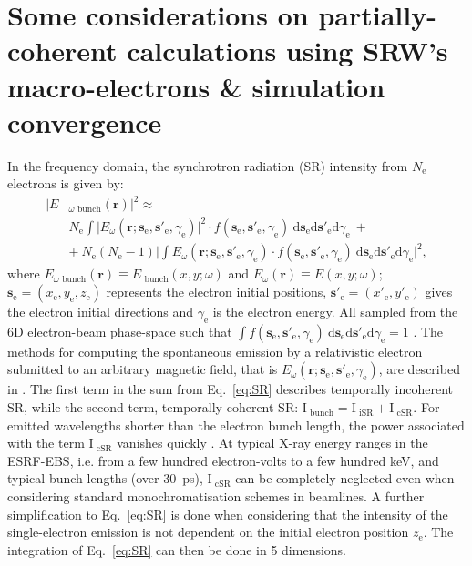\documentclass{iucr}              %
\begin{document}
\section{Some considerations on partially-coherent calculations using SRW's macro-electrons \& simulation convergence}
\label{appendix:srw}
In the frequency domain, the synchrotron radiation (SR) intensity from $N_\text{e}$ electrons is given by: 
\begin{equation}
\begin{split}
|E&_{\omega\text{~bunch}}(\textbf{r})|^2 \approx \\
 &N_\text{e} \int\big| E_\omega(\textbf{r};\textbf{s}_\text{e}, \textbf{s}'_\text{e}, \gamma_\text{e})\big|^2\cdot f(\textbf{s}_\text{e}, \textbf{s}'_\text{e}, \gamma_\text{e})~ \text{d}\textbf{s}_\text{e} \text{d}\textbf{s}'_\text{e} \text{d}\gamma_\text{e}~+\\
&+~ N_\text{e}(N_\text{e}-1)\bigg| \int E_\omega(\textbf{r};\textbf{s}_\text{e}, \textbf{s}'_\text{e}, \gamma_\text{e})\cdot f(\textbf{s}_\text{e}, \textbf{s}'_\text{e}, \gamma_\text{e})~ \text{d}\textbf{s}_\text{e} \text{d}\textbf{s}'_\text{e} \text{d}\gamma_\text{e} \bigg|^2,
\end{split}
\label{eq:SR}
\end{equation}
where $E_{\omega\text{~bunch}}(\textbf{r})\equiv E_{\text{~bunch}}(x,y;\omega)$ and $E_\omega(\textbf{r})\equiv E(x,y;\omega)$; $\textbf{s}_\text{e}=(x_\text{e},y_\text{e},z_\text{e})$ represents the electron initial positions, $\textbf{s}'_\text{e}=(x'_\text{e},y'_\text{e})$ gives the electron initial directions and $\gamma_\text{e}$ is the electron energy. All sampled from the 6D electron-beam phase-space such that $\int f(\textbf{s}_\text{e}, \textbf{s}'_\text{e}, \gamma_\text{e})~ \text{d}\textbf{s}_\text{e} \text{d}\textbf{s}'_\text{e} \text{d}\gamma_\text{e}=1$ \cite{codeSRW_CSR}. The methods for computing the spontaneous emission by a relativistic electron submitted to an arbitrary magnetic field, that is $E_\omega(\textbf{r};\textbf{s}_\text{e}, \textbf{s}'_\text{e}, \gamma_\text{e})$, are described in \cite{Chubar1995,codeSRW}.
The first term in the sum from Eq.~\ref{eq:SR} describes temporally incoherent SR, while the second term, temporally coherent SR: $\text{I}_\text{~bunch} = \text{I}_\text{~iSR}+\text{I}_\text{~cSR}$. For emitted wavelengths shorter than the electron bunch length, the power associated with the term $\text{I}_\text{~cSR}$ vanishes quickly \cite{Wiedemann2015}. At typical X-ray energy ranges in the ESRF-EBS, i.e. from a few hundred electron-volts to a few hundred keV, and typical bunch lengths (over 30~ps), $\text{I}_\text{~cSR}$ can be completely neglected even when considering standard monochromatisation schemes in beamlines. A further simplification to Eq.~\ref{eq:SR} is done when considering that the intensity of the single-electron emission is not dependent on the initial electron position $z_\text{e}$. The integration of Eq.~\ref{eq:SR} can then be done in 5 dimensions.
\end{document}
